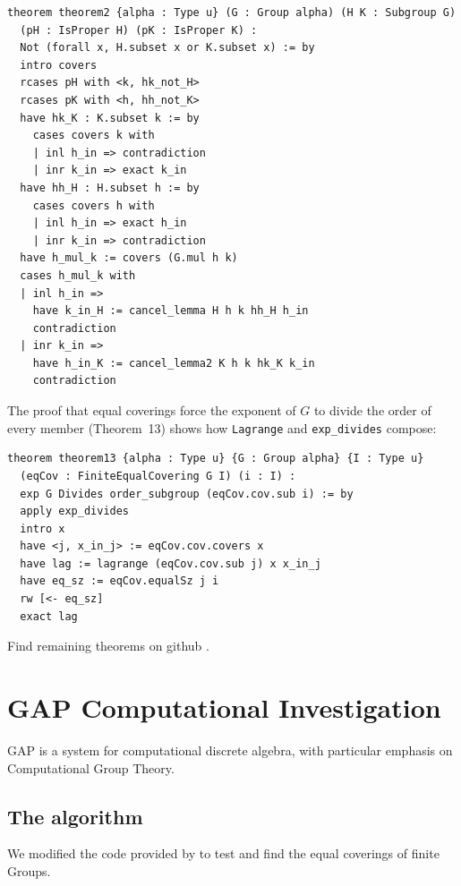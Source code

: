 \documentclass[12pt, a4paper]{article}
\theoremstyle{plain}
\theoremstyle{definition}
\begin{document}
\begin{lstlisting}[caption={Formalization of Theorem 2: $\sigma(G) \neq 2$}]
theorem theorem2 {alpha : Type u} (G : Group alpha) (H K : Subgroup G)
  (pH : IsProper H) (pK : IsProper K) :
  Not (forall x, H.subset x or K.subset x) := by
  intro covers
  rcases pH with <k, hk_not_H>
  rcases pK with <h, hh_not_K>
  have hk_K : K.subset k := by
    cases covers k with
    | inl h_in => contradiction
    | inr k_in => exact k_in
  have hh_H : H.subset h := by
    cases covers h with
    | inl h_in => exact h_in
    | inr k_in => contradiction
  have h_mul_k := covers (G.mul h k)
  cases h_mul_k with
  | inl h_in =>
    have k_in_H := cancel_lemma H h k hh_H h_in
    contradiction
  | inr k_in =>
    have h_in_K := cancel_lemma2 K h k hk_K k_in
    contradiction
\end{lstlisting}

The proof that equal coverings force the exponent of $G$ to divide the
order of every member (Theorem~13) shows how \texttt{Lagrange} and
\texttt{exp\_divides} compose:

\begin{lstlisting}[caption={Formalization of Theorem 13}]
theorem theorem13 {alpha : Type u} {G : Group alpha} {I : Type u}
  (eqCov : FiniteEqualCovering G I) (i : I) :
  exp G Divides order_subgroup (eqCov.cov.sub i) := by
  apply exp_divides
  intro x
  have <j, x_in_j> := eqCov.cov.covers x
  have lag := lagrange (eqCov.cov.sub j) x x_in_j
  have eq_sz := eqCov.equalSz j i
  rw [<- eq_sz]
  exact lag
\end{lstlisting}


Find remaining theorems on github \cite{github}.

\section{GAP Computational Investigation}
\label{sec:gap}

GAP is a system for computational discrete algebra, with particular emphasis on Computational Group Theory. \cite{gap}
\subsection{The algorithm }
We modified the code provided by \cite{velasquez2022} to test and find the equal coverings of finite Groups. 
\end{document}
